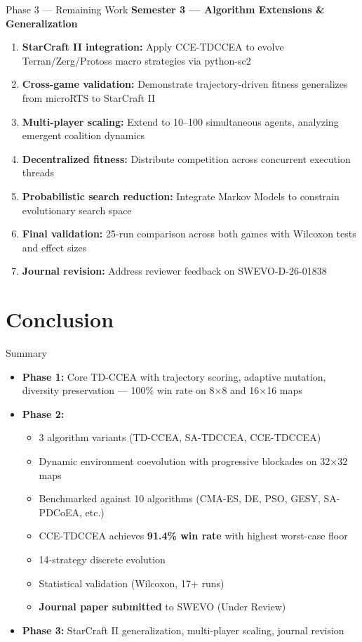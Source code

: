 \documentclass[aspectratio=169, 10pt]{beamer}
\begin{document}
\begin{frame}{Phase 3 --- Remaining Work}
\textbf{\textcolor{amritaMaroon}{Semester 3 --- Algorithm Extensions \& Generalization}}
\begin{enumerate}
    \item \textbf{StarCraft II integration:} Apply CCE-TDCCEA to evolve Terran/Zerg/Protoss macro strategies via python-sc2
    \item \textbf{Cross-game validation:} Demonstrate trajectory-driven fitness generalizes from microRTS to StarCraft II
    \item \textbf{Multi-player scaling:} Extend to 10--100 simultaneous agents, analyzing emergent coalition dynamics
    \item \textbf{Decentralized fitness:} Distribute competition across concurrent execution threads
    \item \textbf{Probabilistic search reduction:} Integrate Markov Models to constrain evolutionary search space
    \item \textbf{Final validation:} 25-run comparison across both games with Wilcoxon tests and effect sizes
    \item \textbf{Journal revision:} Address reviewer feedback on SWEVO-D-26-01838
\end{enumerate}
\end{frame}

\section{Conclusion}

\begin{frame}{Summary}
\begin{itemize}
    \item \textbf{Phase 1:} Core TD-CCEA with trajectory scoring, adaptive mutation, diversity preservation --- 100\% win rate on 8$\times$8 and 16$\times$16 maps
    \item \textbf{Phase 2:}
    \begin{itemize}
        \item 3 algorithm variants (TD-CCEA, SA-TDCCEA, CCE-TDCCEA)
        \item Dynamic environment coevolution with progressive blockades on 32$\times$32 maps
        \item Benchmarked against 10 algorithms (CMA-ES, DE, PSO, GESY, SA-PDCoEA, etc.)
        \item CCE-TDCCEA achieves \textbf{91.4\% win rate} with highest worst-case floor
        \item 14-strategy discrete evolution
        \item Statistical validation (Wilcoxon, 17+ runs)
        \item \textbf{Journal paper submitted} to SWEVO (Under Review)
    \end{itemize}
    \item \textbf{Phase 3:} StarCraft II generalization, multi-player scaling, journal revision
\end{itemize}
\end{frame}
\end{document}
